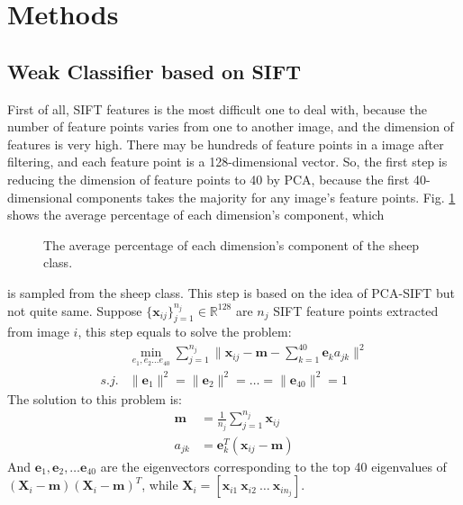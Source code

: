 \documentclass[conference]{IEEEtran}
\begin{document}
\section{Methods} 
\subsection{Weak Classifier based on SIFT}
First of all, SIFT features is the most difficult one to deal with, because the number of feature points varies from one to another image, and the dimension of features is very high. There may be hundreds of feature points in a image after filtering, and each feature point is a 128-dimensional vector. So, the first step is reducing the dimension of feature points to 40 by PCA, because the first 40-dimensional components takes the majority for any image's feature points. Fig. \ref{pca} shows the average percentage of each dimension's component, which 
\begin{figure}[H]
				\centering
				\caption{The average percentage of each dimension's component of the sheep class.  }\label{pca}
\end{figure}
 \noindent is sampled from the sheep class. This step is based on the idea of PCA-SIFT but not quite same. Suppose $\{\mathbf{x}_{ij}\}^{n_j}_{j=1} \in \mathbb{R}^{128}$ are $n_j$ SIFT feature points extracted from image $i$, this step equals to solve the problem:
\begin{align}
	&\min_{e_1,e_2\dots  e_{40}}\sum\limits_{j=1}^{n_j} \|\mathbf{x}_{ij} - \mathbf{m} - \sum\limits_{k=1}^{40}\mathbf{e}_ka_{jk}\|^2\\
	s.j.& \|\mathbf{e}_1\|^2 = \|\mathbf{e}_2\|^2 = \dots = \|\mathbf{e}_{40}\|^2 = 1
\end{align}
The solution to this problem is:
\begin{align}
	\mathbf{m}& = \frac{1}{n_j}\sum\limits_{j=1}^{n_j}\mathbf{x}_{ij}\\
	a_{jk}& = \mathbf{e}_{k}^T(\mathbf{x}_{ij} - \mathbf{m})
\end{align}
And $\mathbf{e}_1,\mathbf{e}_2,\dots \mathbf{e}_{40}$ are the eigenvectors corresponding to the top 40 eigenvalues of $(\mathbf{X}_i-\mathbf{m})(\mathbf{X}_i-\mathbf{m})^T$, while $\mathbf{X}_i = [\mathbf{x}_{i1}\ \mathbf{x}_{i2}\ \dots \ \mathbf{x}_{in_j}]$.
\end{document}
